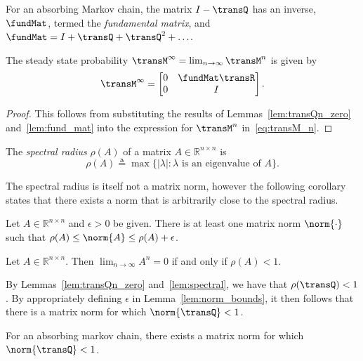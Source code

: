 \begin{myLemma}
	\label{lem:fund_mat}
	For an absorbing Markov chain, the matrix $I - \transQ$ has an inverse, $\fundMat$, termed the \emph{fundamental matrix}, and $\fundMat  = I+\transQ+\transQ^2 + \ldots$.
\end{myLemma}

\begin{myLemma}
	\label{lem:transM_infty}
	The steady state probability $\transM^{\infty} = \lim_{n \to \infty} \transM^{n}$ is given by 
	\begin{equation}
	\label{eq:transM_infty}
		\transM^{\infty} = 
			\begin{bmatrix}
				0 & \fundMat \transR \\ 
				0 & I
			\end{bmatrix}.
	\end{equation}
\end{myLemma}
\begin{proof}
	This follows from substituting the results of Lemmas~\ref{lem:transQn_zero} and~\ref{lem:fund_mat} into the expression for $\transM^n$ in~\ref{eq:transM_n}.
\end{proof}

\begin{mydef}
	The \emph{spectral radius} $\rho(A)$ of a matrix $A \in \mathbb{R}^{n \times n}$ is 
	\begin{equation}
		\rho(A) \triangleq \max \{|\lambda| : \lambda \textrm{ is an eigenvalue of } A\}.
	\end{equation}
\end{mydef}

The spectral radius is itself not a matrix norm, however the following corollary states that there exists a norm that is arbitrarily close to the spectral radius.

\begin{myLemma}
	\label{lem:norm_bounds}
	Let $A \in \mathbb{R}^{n \times n}$ and $\epsilon > 0$ be given.  There is at least one matrix norm $\norm{\cdot}$ such that $\rho(A) \leq \norm{A} \leq \rho(A) + \epsilon$.
\end{myLemma}

\begin{myLemma}
	\label{lem:spectral}
	Let $A \in \mathbb{R}^{n \times n}$.  Then $\lim_{n \to \infty} A^n = 0$ if and only if $\rho(A) < 1$.
\end{myLemma}

By Lemmas~\ref{lem:transQn_zero} and~\ref{lem:spectral}, we have that $\rho(\transQ) < 1$.  By appropriately defining $\epsilon$ in Lemma~\ref{lem:norm_bounds}, it then follows that there is a matrix norm for which $\norm{\transQ} < 1$.

\begin{mycor}
	\label{cor:transQ_norm}
	For an absorbing markov chain, there exists a matrix norm for which $\norm{\transQ} < 1$.
\end{mycor}